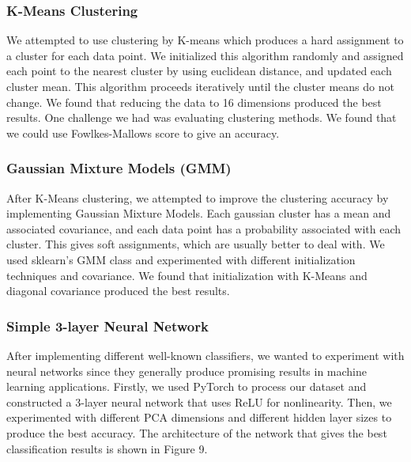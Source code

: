 \subsubsection{\textbf{K-Means Clustering}}
We attempted to use clustering by K-means which produces a hard assignment to a cluster for each data point. We initialized this algorithm randomly and assigned each point to the nearest cluster by using euclidean distance, and updated each cluster mean. This algorithm proceeds iteratively until the cluster means do not change. We found that reducing the data to 16 dimensions produced the best results. One challenge we had was evaluating clustering methods. We found that we could use Fowlkes-Mallows score to give an accuracy.

\subsubsection{\textbf{Gaussian Mixture Models (GMM)}}
After K-Means clustering, we attempted to improve the clustering accuracy by implementing Gaussian Mixture Models. Each gaussian cluster has a mean and associated covariance, and each data point has a probability associated with each cluster. This gives soft assignments, which are usually better to deal with. We used sklearn's GMM class and experimented with different initialization techniques and covariance. We found that initialization with K-Means and diagonal covariance produced the best results.

\subsubsection{\textbf{Simple 3-layer Neural Network}}
After implementing different well-known classifiers, we wanted to experiment with neural networks since they generally produce promising results in machine learning applications. Firstly, we used PyTorch to process our dataset and constructed a 3-layer neural network that uses ReLU for nonlinearity. Then, we experimented with different PCA dimensions and different hidden layer sizes to produce the best accuracy. The architecture of the network that gives the best classification results is shown in Figure 9. 

